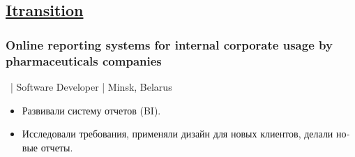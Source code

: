\documentclass[a4paper]{article}
\begin{document}
\begin{minipage}[t]{0.55\textwidth}
    \subsection*{\href{http://www.itransition.com/}{Itransition}}
	\subsubsection*{Online reporting systems for internal corporate usage by pharmaceuticals companies}
    \ | Software Developer | Minsk, Belarus
	\begin{otherlanguage}{russian}
      \begin{itemize}
        \item Развивали систему отчетов (BI). 
        \item Исследовали требования, применяли дизайн для новых клиентов, делали новые отчеты.
      \end{itemize}
	\end{otherlanguage}

  \end{minipage}
\end{document}
